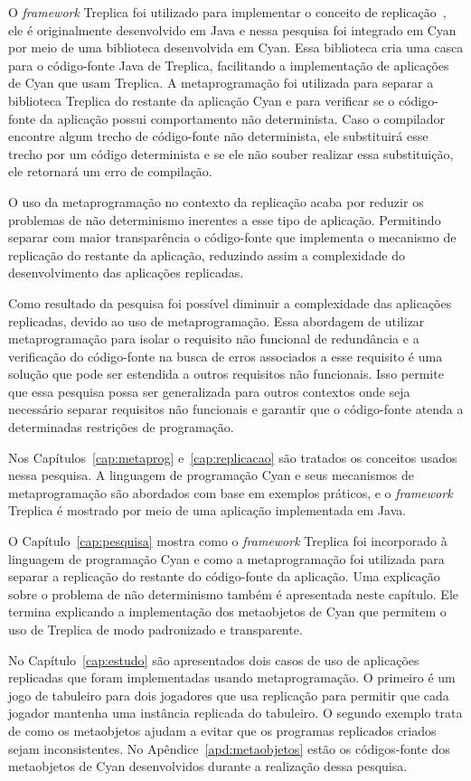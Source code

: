 O \emph{framework} Treplica foi utilizado para implementar o conceito de replicação~\cite{vieira08a}, ele é originalmente desenvolvido em Java e nessa pesquisa foi integrado em Cyan por meio de uma biblioteca desenvolvida em Cyan. Essa biblioteca cria uma casca para o código-fonte Java de Treplica, facilitando a implementação de aplicações de Cyan que usam Treplica. A metaprogramação foi utilizada para separar a biblioteca Treplica do restante da aplicação Cyan e para verificar se o código-fonte da aplicação possui comportamento não determinista. Caso o compilador encontre algum trecho de código-fonte não determinista, ele substituirá esse trecho por um código determinista e se ele não souber realizar essa substituição, ele retornará um erro de compilação.

O uso da metaprogramação no contexto da replicação acaba por reduzir os problemas de não determinismo inerentes a esse tipo de aplicação. Permitindo separar com maior transparência o código-fonte que implementa o mecanismo de replicação do restante da aplicação, reduzindo assim a complexidade do desenvolvimento das aplicações replicadas.

Como resultado da pesquisa foi possível diminuir a complexidade das aplicações replicadas, devido ao uso de metaprogramação. Essa abordagem de utilizar metaprogramação para isolar o requisito não funcional de redundância e a verificação do código-fonte na busca de erros associados a esse requisito é uma solução que pode ser estendida a outros requisitos não funcionais. Isso permite que essa pesquisa possa ser generalizada para outros contextos onde seja necessário separar requisitos não funcionais e garantir que o código-fonte atenda a determinadas restrições de programação.

Nos Capítulos~\ref{cap:metaprog} e~\ref{cap:replicacao} são tratados os conceitos usados nessa pesquisa. A linguagem de programação Cyan e seus mecanismos de metaprogramação são abordados com base em exemplos práticos, e o \emph{framework} Treplica é mostrado por meio de uma aplicação implementada em Java.

O Capítulo~\ref{cap:pesquisa} mostra como o \emph{framework} Treplica foi incorporado à linguagem de programação Cyan e como a metaprogramação foi utilizada para separar a replicação do restante do código-fonte da aplicação. Uma explicação sobre o problema de não determinismo também é apresentada neste capítulo. Ele termina explicando a implementação dos metaobjetos de Cyan que permitem o uso de Treplica de modo padronizado e transparente. 

No Capítulo~\ref{cap:estudo} são apresentados dois casos de uso de aplicações replicadas que foram implementadas usando metaprogramação. O primeiro é um jogo de tabuleiro para dois jogadores que usa replicação para permitir que cada jogador mantenha uma instância replicada do tabuleiro. O segundo exemplo trata de como os metaobjetos ajudam a evitar que os programas replicados criados sejam inconsistentes. No Apêndice~\ref{apd:metaobjetos} estão os códigos-fonte dos metaobjetos de Cyan desenvolvidos durante a realização dessa pesquisa.
 